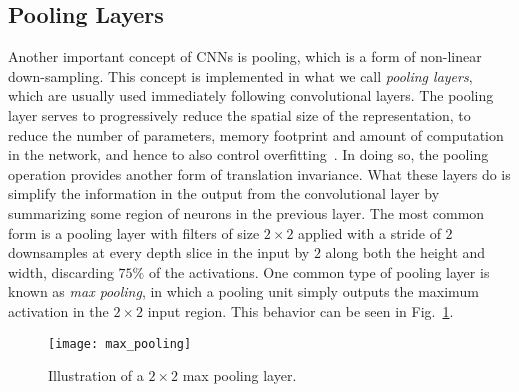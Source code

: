 \documentclass[../main.tex]{subfiles}
\begin{document}
\subsection{Pooling Layers}
Another important concept of CNNs is pooling, which is a form of non-linear down-sampling.
%
This concept is implemented in what we call \emph{pooling layers}, which are usually used immediately following
convolutional layers.
%
The pooling layer serves to progressively reduce the spatial size of the representation, to reduce the number of
parameters, memory footprint and amount of computation in the network, and hence to also control
overfitting~\cite{scherer2010evaluation,2014arXiv1412.6806S}.
%
In doing so, the pooling operation provides another form of translation invariance.
%
What these layers do is simplify the information in the output from the convolutional layer by summarizing some region
of neurons in the previous layer.
%
The most common form is a pooling layer with filters of size $2\times2$ applied with a stride of $2$ downsamples at
every depth slice in the input by $2$ along both the height and width, discarding $75\%$ of the activations.
%
One common type of pooling layer is known as \emph{max pooling}, in which a pooling unit simply outputs the maximum
activation in the $2\times2$ input region.
%
This behavior can be seen in Fig.~\ref{fig:max_pool}.
%
\begin{figure}[htpb]
  \centering
  \texttt{[image: max\_pooling]}
  \caption{Illustration of a $2\times2$ max pooling layer.}%
\label{fig:max_pool}
\end{figure}
%
\end{document}
